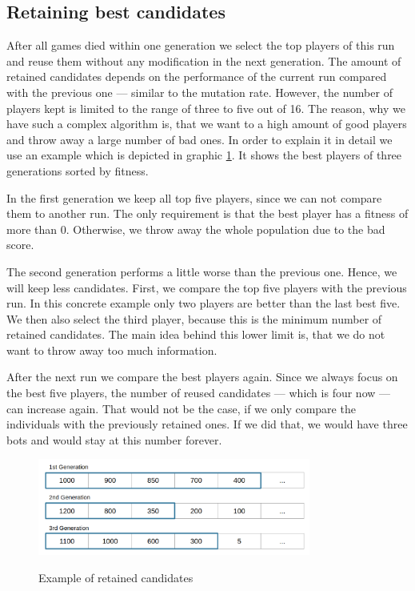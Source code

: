 \documentclass[a4paper,12pt,pagesize,headsepline,bibtotoc,titlepage,abstracton]{scrartcl}
\begin{document}
\subsection{Retaining best candidates}

After all games died within one generation we select the top players of this run and reuse them without any modification in the next generation. The amount of retained candidates depends on the performance of the current run compared with the previous one --- similar to the mutation rate. However, the number of players kept is limited to the range of three to five out of 16. The reason, why we have such a complex algorithm is, that we want to a high amount of good players and throw away a large number of bad ones. In order to explain it in detail we use an example which is depicted in graphic \ref{abb:retaining}. It shows the best players of three generations sorted by fitness.

In the first generation we keep all top five players, since we can not compare them to another run. The only requirement is that the best player has a fitness of more than 0. Otherwise, we throw away the whole population due to the bad score.

The second generation performs a little worse than the previous one. Hence, we will keep less candidates. First, we compare the top five players with the previous run. In this concrete example only two players are better than the last best five. We then also select the third player, because this is the minimum number of retained candidates. The main idea behind this lower limit is, that we do not want to throw away too much information.

After the next run we compare the best players again. Since we always focus on the best five players, the number of reused candidates --- which is four now --- can increase again. That would not be the case, if we only compare the individuals with the previously retained ones. If we did that, we would have three bots and would stay at this number forever.

\begin{figure}[h]
\begin{center}
\includegraphics*[width=0.8\textwidth]{images/retain_candidates}\\
\caption{Example of retained candidates}
\label{abb:retaining}
\end{center}
\end{figure}
\end{document}
